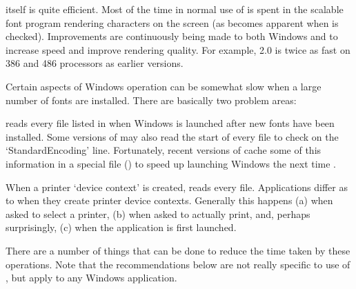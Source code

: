 
{\DVIWindo} itself is quite efficient.  
Most of the time in normal use of
{\DVIWindo} is spent in the scalable font program %
rendering characters on the screen 
(as becomes apparent when  is checked).
Improvements are continuously %
being made to both Windows and {\ATM} to increase
speed and improve rendering quality. %
For example, {\ATM} 2.0 is twice as fast on 386 and 486 processors as
earlier versions.


Certain aspects of Windows operation can be somewhat slow when a large
number of fonts are installed. 
There are basically two problem areas:

\beginbullets

\bpar
{\ATM} reads every {\PFM} file listed in {\ATMINI} 
when Windows is launched after new fonts have been installed.
Some versions of {\ATM} may also read the start of every {\PFB} 
file to check on the `StandardEncoding' line.
Fortunately, recent versions of {\ATM}  cache some of this
information in a special file ({\ATMQLC}) to speed up launching Windows
the next time%
. %

\bpar When a printer `device context' is created,
{\PSCRIPT} reads every {\PFM} file.  
Applications differ as to when they create printer device contexts.
Generally this happens (a) when asked to select a printer,
(b) when asked to actually print, and,  %
perhaps surprisingly, (c) when the application is first launched.

\endbullets

\noindent
There are a number of things that can be done to reduce the
time taken by these operations.
Note that the recommendations below are not really specific to use of
{\DVIWindo}, but apply to any Windows application. 

